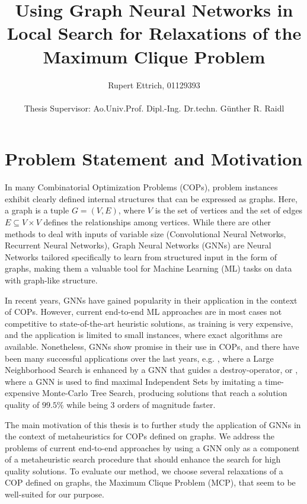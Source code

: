 \documentclass [11pt]{article}
\title{Using Graph Neural Networks in Local Search for Relaxations of the Maximum Clique Problem}
\author{Rupert Ettrich, 01129393 \\\\ Thesis Supervisor: Ao.Univ.Prof. Dipl.-Ing. Dr.techn. Günther R. Raidl}
\date{}
\begin{document}
	
\maketitle 
 
\section{Problem Statement and Motivation}

In many Combinatorial Optimization Problems (COPs), problem instances exhibit clearly defined internal structures that can be expressed as graphs. Here, a graph is a tuple $G = (V, E)$, where $V$ is the set of vertices and the set of edges $E \subseteq V \times V$ defines the relationships among vertices. While there are other methods to deal with inputs of variable size (Convolutional Neural Networks, Recurrent Neural Networks), Graph Neural Networks (GNNs) are Neural Networks tailored specifically to learn from structured input in the form of graphs, making them a valuable tool for Machine Learning (ML) tasks on data with graph-like structure.   

In recent years, GNNs have gained popularity in their application in the context of COPs. However, current end-to-end ML approaches are in most cases not competitive to state-of-the-art heuristic solutions, as training is very expensive, and the application is limited to small instances, where exact algorithms are available. Nonetheless, GNNs show promise in their use in COPs, and there have been many successful applications over the last years, e.g. 
\cite{Oberweger2022}, where a Large Neighborhood Search is enhanced by a GNN that guides a destroy-operator, or \cite{NEURIPS2021_0db2e204}, where a GNN is used to find maximal Independent Sets by imitating a time-expensive Monte-Carlo Tree Search, producing solutions that reach a solution quality of $99.5\%$ while being 3 orders of magnitude faster. 

The main motivation of this thesis is to further study the application of GNNs in the context of metaheuristics for COPs defined on graphs. We address the problems of current end-to-end approaches by using a GNN only as a component of a metaheuristic search procedure that should enhance the search for high quality solutions. To evaluate our method, we choose several relaxations of a COP defined on graphs, the Maximum Clique Problem (MCP), that seem to be well-suited for our purpose. 
\end{document}

